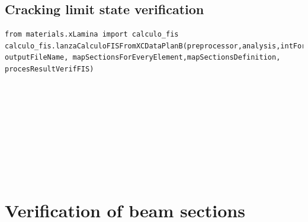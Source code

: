 \subsection{Cracking limit state verification}
\begin{verbatim}
from materials.xLamina import calculo_fis
calculo_fis.lanzaCalculoFISFromXCDataPlanB(preprocessor,analysis,intForcCombFileName,
outputFileName, mapSectionsForEveryElement,mapSectionsDefinition,
procesResultVerifFIS)
\end{verbatim}
\begin{paramFuncTable}
\preprocessor{} \\
\analysis{} \\
\\
\outputFileName{}\\
\mapSectionsForEveryElement{} \\
\mapSectionsDefinition{} \\
\mapInteractionDiagrams{} \\
\procesResultVerifFIS{} \\
\end{paramFuncTable}








\section{Verification of beam sections}

